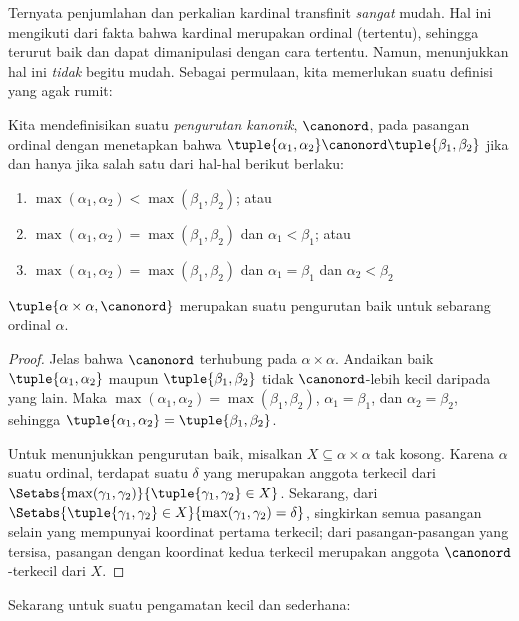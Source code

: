 \documentclass[../../../include/open-logic-section]{subfiles}
\begin{document}


Ternyata penjumlahan dan perkalian kardinal transfinit \emph{sangat} mudah.
Hal ini mengikuti dari fakta bahwa kardinal merupakan ordinal (tertentu),
sehingga terurut baik dan dapat dimanipulasi dengan cara tertentu. Namun,
menunjukkan hal ini \emph{tidak} begitu mudah. Sebagai permulaan, kita
memerlukan suatu definisi yang agak rumit:

\begin{defn}
Kita mendefinisikan suatu \emph{pengurutan kanonik}, $\canonord$, pada
pasangan ordinal dengan menetapkan bahwa
$\tuple{\alpha_1, \alpha_2} \canonord
\tuple{\beta_1, \beta_2}$ jika dan hanya jika salah satu dari hal-hal berikut
berlaku:
\begin{enumerate}
	\item $\max(\alpha_1, \alpha_2) < \max(\beta_1, \beta_2)$; atau
	\item $\max(\alpha_1, \alpha_2) = \max(\beta_1, \beta_2)$ dan
	$\alpha_1 < \beta_1$; atau
	\item $\max(\alpha_1, \alpha_2) = \max(\beta_1, \beta_2)$ dan
	$\alpha_1 = \beta_1$ dan $\alpha_2 < \beta_2$
\end{enumerate}
\end{defn}

\begin{lem}
$\tuple{\alpha \times \alpha, \canonord}$ merupakan suatu pengurutan baik
untuk sebarang ordinal $\alpha$.
\end{lem}

\begin{proof}
Jelas bahwa $\canonord$ terhubung pada $\alpha \times \alpha$. Andaikan
baik $\tuple{\alpha_1, \alpha_2}$ maupun $\tuple{\beta_1, \beta_2}$ tidak
$\canonord$-lebih kecil daripada yang lain. Maka
$\max(\alpha_1, \alpha_2) = \max(\beta_1, \beta_2)$,
$\alpha_1 = \beta_1$, dan $\alpha_2 = \beta_2$, sehingga
$\tuple{\alpha_1, \alpha_2} = \tuple{\beta_1,  \beta_2}$.

Untuk menunjukkan pengurutan baik, misalkan
$X \subseteq \alpha\times\alpha$ tak kosong. Karena $\alpha$ suatu ordinal,
terdapat suatu $\delta$ yang merupakan anggota terkecil dari
$\Setabs{\max(\gamma_1, \gamma_2)}{\tuple{\gamma_1, \gamma_2} \in X}$.
Sekarang, dari
$\Setabs{\tuple{\gamma_1,\gamma_2} \in X}{\max(\gamma_1, \gamma_2) =
\delta}$, singkirkan semua pasangan selain yang mempunyai koordinat pertama
terkecil; dari pasangan-pasangan yang tersisa, pasangan dengan koordinat
kedua terkecil merupakan anggota $\canonord$-terkecil dari $X$.
\end{proof}
\noindent
Sekarang untuk suatu pengamatan kecil dan sederhana:
\end{document}

